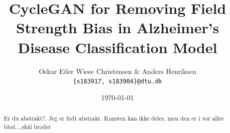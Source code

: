 \documentclass[12pt, fleqn, titlepage]{article}
\title{CycleGAN for Removing Field Strength Bias in Alzheimer's Disease Classification Model}
\author{Oskar Eiler Wiese Christensen \& Anders Henriksen \\ \texttt{\{s183917, s183904\}@dtu.dk}}
\date{\today}
\newcommand{\1}[1]{\mathds{1}\left[#1\right]}
\begin{document}
\maketitle
\begin{abstract}
	\small
	\noindent
	Er du abstrakt?. Jeg er født abstrakt. 
	Kunsten kan ikke deles, men den er i vor alles blod....skål broder
	
\end{abstract}
\end{document}
